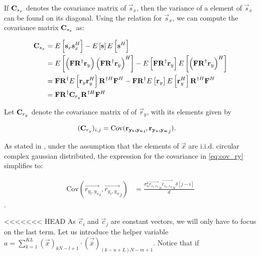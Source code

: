 \documentclass[a4paper, openany, oneside]{memoir}
\begin{document}
If $\boldsymbol{\mathbf{C}}_{s_x}$ denotes the covariance matrix of $\vec{s}_x$, then the variance of a element of $\vec{s}_x$ can be found on its diagonal.
Using the relation for $\vec{s}_x$, we can compute the covariance matrix $\boldsymbol{\mathbf{C}}_{s_x}$ as:

\begin{align*}
\boldsymbol{\mathbf{C}}_{s_x} &= E\left[\boldsymbol{\mathbf{s}}_x\boldsymbol{\mathbf{s}}_x^H\right] - E\left[\boldsymbol{\mathbf{s}}\right]E\left[\boldsymbol{\mathbf{s}}^H\right] \\
&= E\left[\left(\boldsymbol{\mathbf{F}} \boldsymbol{\mathbf{R}}^{\dagger}\boldsymbol{\mathbf{r}}_y\right) \left( \boldsymbol{\mathbf{F}}\boldsymbol{\mathbf{R}}^{\dagger}\boldsymbol{\mathbf{r}}_y\right)^H\right] - E\left[\boldsymbol{\mathbf{F}}\boldsymbol{\mathbf{R}}^{\dagger}\boldsymbol{\mathbf{r}}_y\right]E\left[\left(\boldsymbol{\mathbf{F}}\boldsymbol{\mathbf{R}}^{\dagger}\boldsymbol{\mathbf{r}}_y\right)^H\right] \\
&= \boldsymbol{\mathbf{F}}\boldsymbol{\mathbf{R}}^{\dagger} E\left[ \boldsymbol{\mathbf{r}}_y\boldsymbol{\mathbf{r}}_y^H\right]  \boldsymbol{\mathbf{R}}^{\dagger H}\boldsymbol{\mathbf{F}}^H -  \boldsymbol{\mathbf{F}}\boldsymbol{\mathbf{R}}^{\dagger} E\left[ \boldsymbol{\mathbf{r}}_y\right] E\left[\boldsymbol{\mathbf{r}}_y^H\right]   \boldsymbol{\mathbf{R}}^{\dagger H}\boldsymbol{\mathbf{F}}^H \\
&= \boldsymbol{\mathbf{F}}\boldsymbol{\mathbf{R}}^{\dagger} \boldsymbol{\mathbf{C}}_{r_y} \boldsymbol{\mathbf{R}}^{\dagger H}\boldsymbol{\mathbf{F}}^H
\end{align*}

Let $\boldsymbol{\mathbf{C}}_{r_y}$ denote the covariance matrix of of $\vec{r}_y$, with its elements given by

\begin{align}\label{eq:cov_ry}
(\boldsymbol{\mathbf{C}}_{r_y})_{i,j} &= \text{Cov}(\boldsymbol{\mathbf{r_{y_t,y_u}}}_i,\boldsymbol{\mathbf{r_{y_v, y_w}}}_j).
\end{align}

As stated in \cite{ariananda2012compressive}, under the assumption that the elements of $\vec{x}$ are i.i.d. circular complex gaussian distributed, the expression for the covariance in \cref{eq:cov_ry} simplifies to:

\begin{align*}
\text{Cov}(\vec{r_{y_t,y_u}}_i,\vec{r_{y_v, y_w}}_j) &= \frac{\sigma_n^4 \vec{r_{c_t,c_v}}_N \vec{\overline{r}_{c_u,c_w}}_N \delta \left[ j-i\right]}{d}
\end{align*}.

<<<<<<< HEAD
As $\vec{c}_i$ and $\vec{c}_j$ are constant vectors, we will only have to focus on the last term. Let us introduce the helper variable $a =  \sum_{k=1}^{KL} (\vec{x})_{kN-l+1} \cdot (\vec{\overline{x}})_{(k-u+L)N - m+1}$. Notice that if
\end{document}
